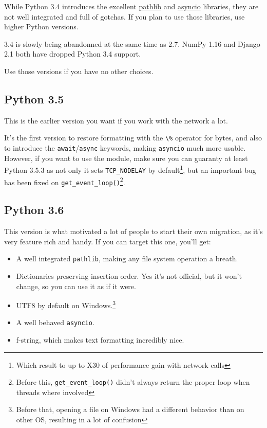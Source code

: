 While Python 3.4 introduces the excellent \href{https://docs.python.org/3/library/pathlib.html}{pathlib} and \href{https://docs.python.org/3/library/asyncio.html}{asyncio} libraries, they are not well integrated and full of gotchas. If you plan to use those libraries, use higher Python versions.

3.4 is slowly being abandonned at the same time as 2.7. NumPy 1.16 and Django 2.1 both have dropped Python 3.4 support.

Use those versions if you have no other choices.

\subsection{Python 3.5}

This is the earlier version you want if you work with the network a lot.

It's the first version to restore formatting with the \lstinline{\%} operator for bytes, and also to introduce the \lstinline{await}/\lstinline{async} keywords, making \lstinline{asyncio} much more usable. However, if you want to use the module, make sure you can guaranty at least Python 3.5.3 as not only it sets \lstinline{TCP_NODELAY} by default\footnote{Which result to up to X30 of performance gain with network calls}, but an important bug has been fixed on \lstinline{get_event_loop()}\footnote{Before this, \lstinline{get_event_loop()} didn't always return the proper loop when threads where involved}.

\subsection{Python 3.6}

This version is what motivated a lot of people to start their own migration, as it's very feature rich and handy. If you can target this one, you'll get:

\begin{itemize}
\item A well integrated \lstinline{pathlib}, making any file system operation a breath.
\item Dictionaries preserving insertion order. Yes it's not official, but it won't change, so you can use it as if it were.
\item UTF8 by default on Windows.\footnote{Before that, opening a file on Windows had a different behavior than on other OS, resulting in a lot of confusion}
\item A well behaved \lstinline{asyncio}.
\item f-string, which makes text formatting incredibly nice.
\end{itemize}

